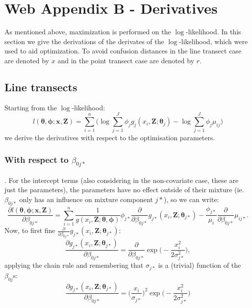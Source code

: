 \documentclass[useAMS,referee]{biom}
\begin{document}
\section*{Web Appendix B - Derivatives}

As mentioned above, maximization is performed on the $\log$-likelihood. In this section we give the derivations of the derivates of the $\log$-likelihood, which were used to aid optimization. To avoid confusion distances in the line transect case are denoted by $x$ and in the point transect case are denoted by $r$.

\subsection*{Line transects}

Starting from the $\log$-likelihood:
\begin{equation}
l(\bm{\theta}, \bm{\phi}; \mathbf{x},\mathbf{Z}) = \sum_{i=1}^n \Big( \log \sum_{j=1}^J \phi_j g_j(x_i,\mathbf{Z}; \bm{\theta}_j) - \log \sum_{j=1}^J \phi_j \mu_{ij}\Big)
\label{lt-lik}
\end{equation}
we derive the derivatives with respect to the optimisation parameters.

\subsubsection*{With respect to $\beta_{0j*}$}. For the intercept terms (also considering in the non-covariate case, these are just the parameters), the parameters have no effect outside of their mixture (ie. $\beta_{0j*}$ only has an influence on mixture component $j*$), so we can write:
\begin{equation*}
\frac{\partial l(\bm{\theta},\bm{\phi}; \mathbf{x},\mathbf{Z})}{\partial \beta_{0j*}} = \sum_{i=1}^n \frac{1}{g(x_i,\mathbf{Z}; \bm{\theta},\bm{\phi})} \phi_{j*} \frac{\partial}{\partial \beta_{0j*}} g_{j*}(x_i,\mathbf{Z}; \bm{\theta}_{j*})  - \frac{\phi_{j*}}{\mu_i}  \frac{\partial}{\partial \beta_{0j*}} \mu_{ij*}.
\end{equation*}
Now, to first fine $\frac{\partial}{\partial \beta_{0j*}} g_{j*}(x_i,\mathbf{Z}; \bm{\theta}_{j*})$:
\begin{equation*}
\frac{\partial g_{j*}(x_i,\mathbf{Z}; \bm{\theta}_{j*})}{\partial \beta_{0j*}} = \frac{\partial}{\partial \beta_{0j*}} \exp\Big( -\frac{x_i^2}{2\sigma_{j*}^2} \Big),
\end{equation*}
applying the chain rule and remembering that $\sigma_{j*}$ is a (trivial) function of the $\beta_{0j}$s:
\begin{equation*}
\frac{\partial g_{j*}(x_i,\mathbf{Z}; \bm{\theta}_{j*})}{\partial \beta_{0j*}} = \Big( \frac{x_i}{\sigma_{j*}}\Big)^2 \exp \Big(-\frac{x_i^2}{2 \sigma_{j*}^2}\Big)
\end{equation*}
\end{document}

